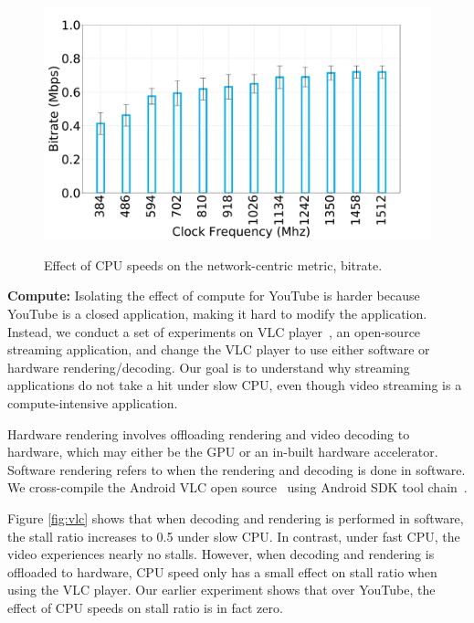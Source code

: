 \begin{figure}
\begin{minipage}[t]{\linewidth}
\hspace{0.25\linewidth}
   \includegraphics[width=0.5\linewidth]{sections/device-work/skype-bitrate.pdf}
   \caption{Effect of CPU speeds on the network-centric metric, bitrate.} 
   \vspace{-0.2in}
   \label{fig:skype-bitrate}
   \end{minipage}
\end{figure}

\noindent \textbf{Compute:} Isolating the effect of compute for YouTube is harder because YouTube is a closed application, making it hard to modify the application. Instead, we conduct a set of experiments on VLC player~\cite{andriodvlc}, an open-source streaming application, and change the VLC player to use either software or hardware rendering/decoding. Our goal is to understand why streaming applications do not take a hit under slow CPU, even though video streaming is a compute-intensive application.  

Hardware rendering involves offloading rendering and video decoding to hardware, which may either be the GPU or an in-built hardware accelerator. Software rendering refers to when the rendering and decoding is done in software.
We cross-compile the Android VLC open source~\cite{andriodvlc} using Android SDK tool chain~\cite{andriodsdk}. 


Figure \ref{fig:vlc} shows that when decoding and rendering is performed in software, the stall ratio increases to 0.5 under slow CPU. In contrast, under fast CPU, the video experiences nearly no stalls. However, when decoding and rendering is offloaded to hardware, CPU speed only has a small effect on stall ratio when using the VLC player. Our earlier experiment shows that over YouTube, the effect of CPU speeds on stall ratio is in fact zero. 

